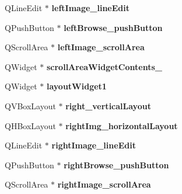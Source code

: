 \begin{DoxyCompactItemize}
\item 
\hypertarget{classUi__QcorrClass_a12d1c71e330c76e65484418502338a31}{
QLineEdit $\ast$ {\bfseries leftImage\_\-lineEdit}}
\label{classUi__QcorrClass_a12d1c71e330c76e65484418502338a31}

\item 
\hypertarget{classUi__QcorrClass_ae05243dcb19bfd6fd6d1c3257f25338a}{
QPushButton $\ast$ {\bfseries leftBrowse\_\-pushButton}}
\label{classUi__QcorrClass_ae05243dcb19bfd6fd6d1c3257f25338a}

\item 
\hypertarget{classUi__QcorrClass_acb12117880660e7d8fec35de7eee51c6}{
QScrollArea $\ast$ {\bfseries leftImage\_\-scrollArea}}
\label{classUi__QcorrClass_acb12117880660e7d8fec35de7eee51c6}

\item 
\hypertarget{classUi__QcorrClass_aab5ae2e7dc3baefb6ada5e1a758e826f}{
QWidget $\ast$ {\bfseries scrollAreaWidgetContents\_}}
\label{classUi__QcorrClass_aab5ae2e7dc3baefb6ada5e1a758e826f}

\item 
\hypertarget{classUi__QcorrClass_a24caba38fd151a2ab5b577b1425bd07c}{
QWidget $\ast$ {\bfseries layoutWidget1}}
\label{classUi__QcorrClass_a24caba38fd151a2ab5b577b1425bd07c}

\item 
\hypertarget{classUi__QcorrClass_a232c26905d00f6608b8ba97a6546daa0}{
QVBoxLayout $\ast$ {\bfseries right\_\-verticalLayout}}
\label{classUi__QcorrClass_a232c26905d00f6608b8ba97a6546daa0}

\item 
\hypertarget{classUi__QcorrClass_a6885fe1dcc883e2f927c2fb943b206e0}{
QHBoxLayout $\ast$ {\bfseries rightImg\_\-horizontalLayout}}
\label{classUi__QcorrClass_a6885fe1dcc883e2f927c2fb943b206e0}

\item 
\hypertarget{classUi__QcorrClass_a690e51bd7f4916ca89f876f39afee05d}{
QLineEdit $\ast$ {\bfseries rightImage\_\-lineEdit}}
\label{classUi__QcorrClass_a690e51bd7f4916ca89f876f39afee05d}

\item 
\hypertarget{classUi__QcorrClass_a5018f953d94c196394a638212a45fd9d}{
QPushButton $\ast$ {\bfseries rightBrowse\_\-pushButton}}
\label{classUi__QcorrClass_a5018f953d94c196394a638212a45fd9d}

\item 
\hypertarget{classUi__QcorrClass_a227cae34e275c9e0713ee279435f41cc}{
QScrollArea $\ast$ {\bfseries rightImage\_\-scrollArea}}
\label{classUi__QcorrClass_a227cae34e275c9e0713ee279435f41cc}


\end{DoxyCompactItemize}
